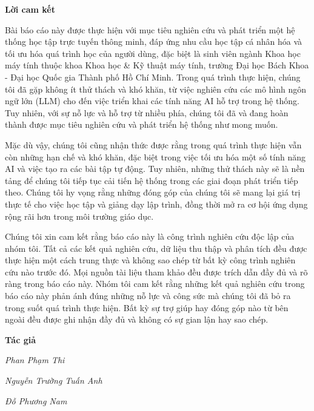 \documentclass[12pt,a4paper]{report}
\theoremstyle{definition}
\begin{document}
\newpage
\begin{center}
    \textbf{\Large Lời cam kết}
\end{center}

\par Bài báo cáo này được thực hiện với mục tiêu nghiên cứu và phát triển một hệ thống học tập trực tuyến thông minh, đáp ứng nhu cầu học tập cá nhân hóa và tối ưu hóa quá trình học của người dùng, đặc biệt là sinh viên ngành Khoa học máy tính thuộc khoa Khoa học \& Kỹ thuật máy tính, trường Đại học Bách Khoa - Đại học Quốc gia Thành phố Hồ Chí Minh. Trong quá trình thực hiện, chúng tôi đã gặp không ít thử thách và khó khăn, từ việc nghiên cứu các mô hình ngôn ngữ lớn (LLM) cho đến việc triển khai các tính năng AI hỗ trợ trong hệ thống. Tuy nhiên, với sự nỗ lực và hỗ trợ từ nhiều phía, chúng tôi đã và đang hoàn thành được mục tiêu nghiên cứu và phát triển hệ thống như mong muốn.
\par Mặc dù vậy, chúng tôi cũng nhận thức được rằng trong quá trình thực hiện vẫn còn những hạn chế và khó khăn, đặc biệt trong việc tối ưu hóa một số tính năng AI và việc tạo ra các bài tập tự động. Tuy nhiên, những thử thách này sẽ là nền tảng để chúng tôi tiếp tục cải tiến hệ thống trong các giai đoạn phát triển tiếp theo. Chúng tôi hy vọng rằng những đóng góp của chúng tôi sẽ mang lại giá trị thực tế cho việc học tập và giảng dạy lập trình, đồng thời mở ra cơ hội ứng dụng rộng rãi hơn trong môi trường giáo dục.
\par Chúng tôi xin cam kết rằng báo cáo này là công trình nghiên cứu độc lập của nhóm tôi. Tất cả các kết quả nghiên cứu, dữ liệu thu thập và phân tích đều được thực hiện một cách trung thực và không sao chép từ bất kỳ công trình nghiên cứu nào trước đó. Mọi nguồn tài liệu tham khảo đều được trích dẫn đầy đủ và rõ ràng trong báo cáo này. Nhóm tôi cam kết rằng những kết quả nghiên cứu trong báo cáo này phản ánh đúng những nỗ lực và công sức mà chúng tôi đã bỏ ra trong suốt quá trình thực hiện. Bất kỳ sự trợ giúp hay đóng góp nào từ bên ngoài đều được ghi nhận đầy đủ và không có sự gian lận hay sao chép.

\par\hfill\textbf{Tác giả}\hspace{1cm}

\par\hfill\textit{Phan Phạm Thi}
\par\hfill\textit{Nguyễn Trường Tuấn Anh}\hspace{0.3cm}
\par\hfill\textit{Đỗ Phương Nam}\hspace{0.2cm}
\newpage
\end{document}
